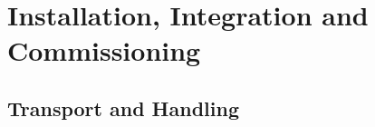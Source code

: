 \section{Installation, Integration and Commissioning}
\label{sec:fdsp-pd-install}



\subsection{Transport and Handling}
\label{sec:fdsp-pd-install-transport}







